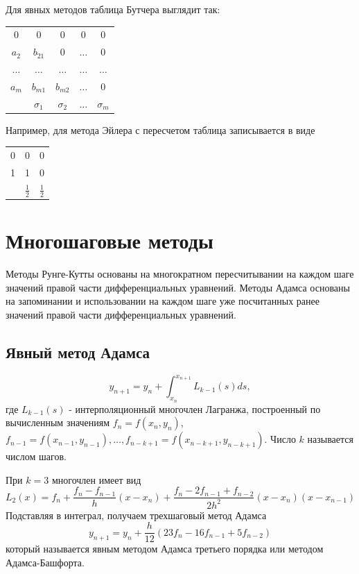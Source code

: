\documentclass[a4paper, 14pt]{extarticle}
\begin{document}
Для явных методов таблица Бутчера выглядит так:

\begin{center}
\begin{tabular}{c|c c c c}
     0 & 0 & 0 & 0 & 0 \\
     $a_2$ & $b_{21}$ & 0 & $\ldots$ & 0 \\
     $\ldots$ & $\ldots$ & $\ldots$ & $\ldots$ & $\ldots$ \\
     $a_m$ & $b_{m1}$ & $b_{m2}$ & $\ldots$ & 0 \\
     \hline
      & $\sigma_1$ & $\sigma_2$ & $\ldots$ & $\sigma_m$
\end{tabular}    
\end{center}

Например, для метода Эйлера с пересчетом таблица 
записывается в виде

\begin{center}
\begin{tabular}{c|c c}
    0 & 0 & 0 \\
    1 & 1 & 0 \\ \hline
      & \(\frac12\) & \(\frac12\)
\end{tabular}
\end{center}

\section{Многошаговые методы}
Методы Рунге-Кутты основаны на многократном пересчитывании на каждом шаге значений правой части дифференциальных 
уравнений. Методы Адамса основаны на запоминании и использовании на каждом шаге уже посчитанных ранее значений правой 
части дифференциальных уравнений.

\subsection{Явный метод Адамса}
\[y_{n+1}=y_n+\int^{x_{n+1}}_{x_n}L_{k-1}(s)ds,\]
где \(L_{k-1}(s)\) - интерполяционный многочлен Лагранжа, построенный по вычисленным значениям \(f_n=f(x_n,y_n)\),
\(f_{n-1}=f(x_{n-1},y_{n-1}), \ldots,f_{n-k+1}=f(x_{n-k+1},y_{n-k+1})\). Число \(k\) называется числом шагов.
\par
При \(k=3\) многочлен имеет вид
\[L_2(x)=f_n+\frac{f_n-f_{n-1}}{h}(x-x_n)+\frac{f_n-2f_{n-1}+f_{n-2}}{2h^2}(x-x_n)(x-x_{n-1})\]
Подставляя в интеграл, получаем трехшаговый метод Адамса
\[y_{n+1}=y_n+\frac{h}{12}(23f_n-16f_{n-1}+5f_{n-2})\]
который называется явным методом Адамса третьего порядка или методом Адамса-Башфорта.
\end{document}
